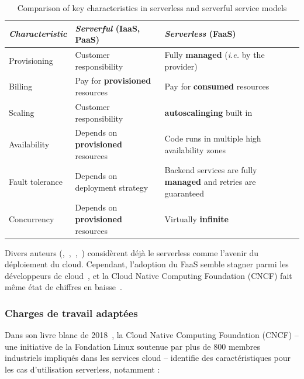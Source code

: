 \begin{table}[H]
    \caption{Comparison of key characteristics in serverless and serverful service models}
    \centering
    \begin{tabularx}{\textwidth} { 
      | >{\centering\arraybackslash}X 
      | >{\centering\arraybackslash}X 
      | >{\centering\arraybackslash}X  | }
         \hline
        \textit{Characteristic}  & \textit{Serverful} (IaaS, PaaS)           & \textit{Serverless} (FaaS)                                             \\ \hline
        Provisioning    & Customer responsibility          & Fully \textbf{managed} (\textit{i.e.} by the provider)    \\ \hline
        Billing         & Pay for \textbf{provisioned} resources    & Pay for \textbf{consumed} resources                                    \\ \hline
        Scaling         & Customer responsibility          & \textbf{autoscalinging} built in                                         \\ \hline
        Availability    & Depends on \textbf{provisioned} resources & Code runs in multiple high availability zones                 \\ \hline
        Fault tolerance & Depends on deployment strategy   & Backend services are fully \textbf{managed} and retries are guaranteed \\ \hline
        Concurrency     & Depends on \textbf{provisioned} resources & Virtually \textbf{infinite} \\
        \hline
    \end{tabularx}
    \label{table:serverful-serverless}
\end{table}

Divers auteurs (\cite{hellersteinServerlessComputingOne2019},~\cite{vaneykSPECRGCloud2018},~\cite{shafieiServerlessComputingSurvey2021},~\cite{khandelwalTaureauDeconstructingServerless2020}) considèrent déjà le serverless comme l'avenir du déploiement du cloud. Cependant, l'adoption du FaaS semble stagner parmi les développeurs de cloud~\cite{oreilly2020adoption}, et la Cloud Native Computing Foundation (CNCF) fait même état de chiffres en baisse~\cite{cncf2021report}.

\subsubsection{Charges de travail adaptées}

Dans son livre blanc de 2018~\cite{cncf2018whitepaper}, la Cloud Native Computing Foundation (CNCF) -- une initiative de la Fondation Linux soutenue par plus de 800 membres industriels impliqués dans les services cloud -- identifie des caractéristiques pour les cas d'utilisation serverless, notamment :

